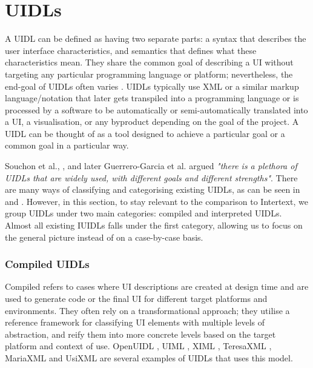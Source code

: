 
\section{UIDLs} \label{relatedUIDLs}

A UIDL can be defined as having two separate parts: a syntax that describes the user interface characteristics, and semantics that defines what these characteristics mean. They share the common goal of describing a UI without targeting any particular programming language or platform; nevertheless, the end-goal of UIDLs often varies \cite{XMLCompliantUIDLs}. UIDLs typically use XML or a similar markup language/notation that later gets transpiled into a programming language or is processed by a software to be automatically or semi-automatically translated into a UI, a visualisation, or any byproduct depending on the goal of the project. A UIDL can be thought of as a tool designed to achieve a particular goal or a common goal in a particular way. 

Souchon et al., \cite{XMLCompliantUIDLs}, and later Guerrero-Garcia et al. \cite{UIDLTheoreticalSurvey} argued \textit{"there is a plethora of UIDLs that are widely used, with different goals and different strengths"}. There are many ways of classifying and categorising existing UIDLs, as can be seen in \cite{XMLCompliantUIDLs} and \cite{UIDLTheoreticalSurvey}. However, in this section, to stay relevant to the comparison to Intertext, we group UIDLs under two main categories: compiled and interpreted UIDLs. Almost all existing IUIDLs falls under the first category, allowing us to focus on the general picture instead of on a case-by-case basis.

\subsubsection{Compiled UIDLs}

Compiled refers to cases where UI descriptions are created at design time and are used to generate code or the final UI for different target platforms and environments. They often rely on a transformational approach; they utilise a reference framework for classifying UI elements with multiple levels of abstraction, and reify them into more concrete levels based on the target platform and context of use. OpenUIDL \cite{openuidl}, UIML \cite{UIML}, XIML \cite{XIML}, TeresaXML \cite{TeresaXML}, MariaXML \cite{MariaXML} and UsiXML \cite{UsiXML} are several examples of UIDLs that uses this model. 

